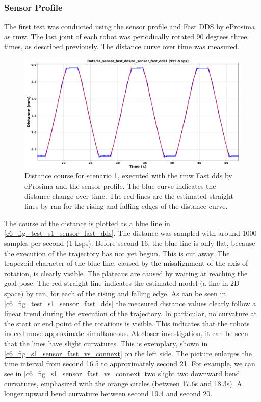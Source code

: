 \subsubsection{Sensor Profile}
The first test was conducted using the sensor profile and Fast DDS by eProsima as \gls{rmw}. The last joint of each robot was periodically rotated 90 degrees three times, as described previously. The distance curve over time was measured.\newline
\begin{figure}[htbp]
	\centering
	\includegraphics[width=1\textwidth]{Figures/c6/s1/s1_sensor_fast_dds.pdf}
	\caption{Distance course for scenario 1, executed with the \gls{rmw} Fast \gls{dds} by eProsima and the sensor profile. The blue curve indicates the distance change over time. The red lines are the estimated straight lines by \gls{ran} for the rising and falling edges of the distance curve.}
	\label{c6_fig_test_s1_sensor_fast_dds}
\end{figure}
The course of the distance is plotted as a blue line in \autoref{c6_fig_test_s1_sensor_fast_dds}. The distance was sampled with around 1000 samples per second (1 \si{ksps}). Before second 16, the blue line is only flat, because the execution of the trajectory has not yet begun. This is cut away. The trapezoid character of the blue line, caused by the misalignment of the axis of rotation, is clearly visible. The plateaus are caused by waiting at reaching the goal pose. The red straight line indicates the estimated model (a line in 2D space) by \gls{ran}, for each of the rising and falling edge. As can be seen in \autoref{c6_fig_test_s1_sensor_fast_dds} the measured distance values clearly follow a linear trend during the execution of the trajectory. In particular, no curvature at the start or end point of the rotations is visible. This indicates that the robots indeed move approximate simultaneous. 
At closer investigation, it can be seen that the lines have slight curvatures. This is exemplary, shown in \autoref{c6_fig_s1_sensor_fast_vs_connext} on the left side. The picture enlarges the time interval from second 16.5 to approximately second 21. For example, we can see in \autoref{c6_fig_s1_sensor_fast_vs_connext} two slight two downward bend curvatures, emphasized with the orange circles (between 17.6s and 18.3s). A longer upward bend curvature between second 19.4 and second 20.


